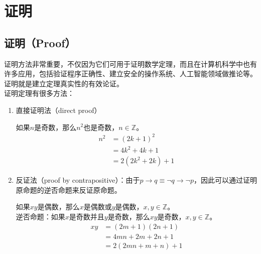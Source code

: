\documentclass[12pt, openany, oneside]{book}
\begin{document}
\newpage

\section{证明}

\subsection{证明（Proof）}

证明方法非常重要，不仅因为它们可用于证明数学定理，而且在计算机科学中也有许多应用，包括验证程序正确性、建立安全的操作系统、人工智能领域做推论等。证明就是建立定理真实性的有效论证。\\

证明定理有很多方法：

\begin{enumerate}
	\item 直接证明法（direct proof）

	      \begin{tcolorbox}
		      如果$ n $是奇数，那么$ n^2 $也是奇数，$ n \in \mathbb{Z} $。
		      \begin{align*}
			      n^2 & = (2k + 1)^2       \\
			          & = 4k^2 + 4k + 1    \\
			          & = 2(2k^2 + 2k) + 1
		      \end{align*}
	      \end{tcolorbox}

	\item 反证法（proof by contrapositive）：由于$ p \rightarrow q \equiv \neg q \rightarrow \neg p $，因此可以通过证明原命题的逆否命题来反证原命题。

	      \begin{tcolorbox}
		      \mybox{证明}
		      如果$ xy $是偶数，那么$ x $是偶数或$ y $是偶数，$ x, y \in \mathbb{Z} $。\\
		      逆否命题：如果$ x $是奇数并且$ y $是奇数，那么$ xy $是奇数，$ x, y \in \mathbb{Z} $。
		      \begin{align*}
			      xy & = (2m + 1)(2n + 1)   \\
			         & = 4mn + 2m +2n + 1   \\
			         & = 2(2mn + m + n) + 1
		      \end{align*}
	      \end{tcolorbox}
\end{enumerate}

\newpage
\end{document}
